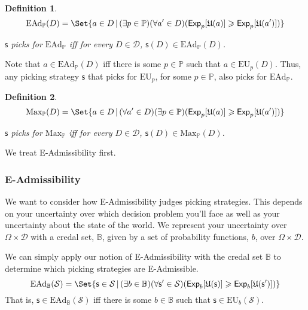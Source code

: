 \documentclass[a4paper]{article}
\newtheorem{definition}{Definition}
\newtheorem{lemma}[theorem]{Lemma}
\renewcommand\P{\mathbb{P}} %
\newcommand\Exp{\mathsf{Exp}}
\newcommand\EU{\mathrm{EU}}
\newcommand\EAd{\mathrm{EAd}}
\newcommand\U{\mathfrak{U}} %
\newcommand\Maximality{\mathrm{Max}}
\newcommand{\D}{\mathcal{D}}
\renewcommand\S{\mathcal{S}}
\newcommand\s{\mathsf{s}}
\newcommand{\IB}{\mathbb{B}}
\newcommand{\IP}{\P}
\renewcommand{\color}[1]{}
\newenvironment{colored}[1]{\leavevmode\color{#1}}{}
\newcommand\SetDelimiter[1][]{
	\nonscript\,#1\vert \allowbreak \nonscript\,\mathopen{}}
\providecommand\given{\SetDelimiter}
\renewcommand{\geq}{\geqslant}
\newenvironment{CCM rewritten}
{\begingroup\color{blue}} %
{\endgroup}              %
\begin{document}
\begin{definition}\label{def:ead}
 $$\EAd_\IP(D) = \Set{a \in D \given (\exists p \in \IP)(\forall a' \in D)(\Exp_p[\U(a)]\geq\Exp_p[\U(a')])}$$
 
 	 $\s$ picks for $\EAd_\IP$ iff for every $D\in\D$, $\s(D)\in\EAd_\IP(D)$. 	
 \end{definition}

	 Note that	$a\in\EAd_\IP(D)$ iff there is some $p\in\IP$ such that $a\in\EU_p(D)$.  
Thus, any picking strategy $\s$ that picks for $\EU_p$, for some $p\in\IP$, also picks for $\EAd_\IP$.
	
	\begin{definition}
	$$\Maximality_\IP(D) = \Set{a \in D \given (\forall a'\in D)(\exists p\in\IP)(\Exp_p[\U(a)] \geq\Exp_p[\U(a')])}$$
	
		 $\s$ picks for $\Maximality_\IP$ iff for every $D\in\D$, $\s(D)\in\Maximality_\IP(D)$.
\end{definition}




We  treat E-Admissibility first. 
	
\subsubsection{E-Admissibility}

 
We want to consider how E-Admissibility judges picking strategies.  
This depends on your uncertainty over which decision problem you'll face as well as your uncertainty about the state of the world. 
We represent your uncertainty over $\Omega \times \D$ with a credal set, $\IB$, given by a set of probability functions, $b$, over $\Omega\times \D$. 

We can simply apply our notion of E-Admissibility with the credal set $\IB$ to determine which picking strategies are E-Admissible. 
 $$\EAd_\IB(\S)=\Set{\s\in\S\given  (\exists b \in \IB)(\forall \s' \in \S)(\Exp_b[\U(\s)]\geq\Exp_b[\U(\s')])}$$
That is, $\s\in\EAd_\IB(\S)$ iff there is some $b\in\IB$ such that $\s\in\EU_b(\S)$. 
%	
\end{document}
